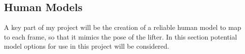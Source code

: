 \subsection{Human Models}

A key part of my project will be the creation of a reliable human model to map to each frame, so that it mimics the pose of the lifter. In this section potential model options for use in this project will be considered.




